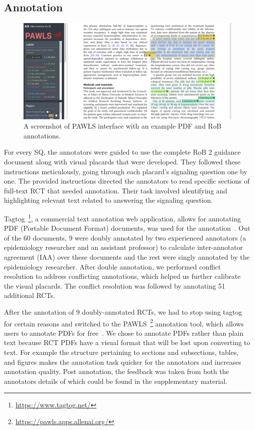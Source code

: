 \documentclass[sn-mathphys,Numbered]{sn-jnl}%
\theoremstyle{thmstyleone}%
\theoremstyle{thmstyletwo}%
\theoremstyle{thmstylethree}%
\begin{document}
\subsection{Annotation}
\label{annotation}
%
%
%
%
\begin{figure}[htb]
    \centering
    \includegraphics[width=0.80\columnwidth]{figures/pawls_layout.png}
    \caption{A screenshot of PAWLS interface with an example PDF and RoB annotations.}
    \label{fig:pawls}
\end{figure}
%
%
%
For every SQ, the annotators were guided to use the complete RoB 2 guidance document along with visual placards that were developed.
They followed these instructions meticulously, going through each placard's signaling question one by one.
The provided instructions directed the annotators to read specific sections of full-text RCT that needed annotation.
Their task involved identifying and highlighting relevant text related to answering the signaling question.


Tagtog~\footnote{\url{https://www.tagtog.net/}}, a commercial text annotation web application, allows for annotating PDF (Portable Document Format) documents, was used for the annotation~\cite{cejuela2014tagtog}.
Out of the 60 documents, 9 were doubly annotated by two experienced annotators (a epidemiology researcher and an assistant professor) to calculate inter-annotator agreement (IAA) over these documents and the rest were singly annotated by the epidemiology researcher.
After double annotation, we performed conflict resolution to address conflicting annotations, which helped us further calibrate the visual placards.
The conflict resolution was followed by annotating 51 additional RCTs.


After the annotation of 9 doubly-annotated RCTs, we had to stop using tagtog for certain reasons and switched to the PAWLS~\footnote{\url{https://pawls.apps.allenai.org/}} annotation tool, which allows users to annotate PDFs for free~\cite{neumann2021pawls}.
We chose to annotate PDFs rather than plain text because RCT PDFs have a visual format that will be lost upon converting to text. 
For example the structure pertaining to sections and subsections, tables, and figures makes the annotation task quicker for the annotators and increases annotation quality.
Post annotation, the feedback was taken from both the annotators details of which could be found in the supplementary material. %
%
%
%
\end{document}

